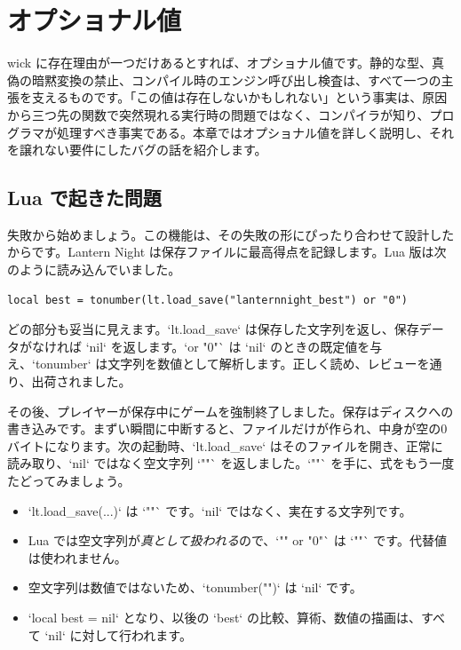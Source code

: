 \chapter{オプショナル値}

wick に存在理由が一つだけあるとすれば、オプショナル値です。静的な型、真偽の暗黙変換の禁止、コンパイル時のエンジン呼び出し検査は、すべて一つの主張を支えるものです。「この値は存在しないかもしれない」という事実は、原因から三つ先の関数で突然現れる実行時の問題ではなく、コンパイラが知り、プログラマが処理すべき事実である。本章ではオプショナル値を詳しく説明し、それを譲れない要件にしたバグの話を紹介します。

\section{Lua で起きた問題}

失敗から始めましょう。この機能は、その失敗の形にぴったり合わせて設計したからです。Lantern Night は保存ファイルに最高得点を記録します。Lua 版は次のように読み込んでいました。

\begin{lstlisting}[language=luatwin]
local best = tonumber(lt.load_save("lanternnight_best") or "0")
\end{lstlisting}

\noindent
どの部分も妥当に見えます。`lt.load_save` は保存した文字列を返し、保存データがなければ `nil` を返します。`or "0"` は `nil` のときの既定値を与え、`tonumber` は文字列を数値として解析します。正しく読め、レビューを通り、出荷されました。

その後、プレイヤーが保存中にゲームを強制終了しました。保存はディスクへの書き込みです。まずい瞬間に中断すると、ファイルだけが作られ、中身が空の0バイトになります。次の起動時、`lt.load_save` はそのファイルを開き、正常に読み取り、`nil` ではなく空文字列 `""` を返しました。`""` を手に、式をもう一度たどってみましょう。

\begin{itemize}
\item `lt.load_save(...)` は `""` です。`nil` ではなく、実在する文字列です。
\item Lua では空文字列が\emph{真として扱われる}ので、`"" or "0"` は `""` です。代替値は使われません。
\item 空文字列は数値ではないため、`tonumber("")` は `nil` です。
\item `local best = nil` となり、以後の `best` の比較、算術、数値の描画は、すべて `nil` に対して行われます。
\end{itemize}


